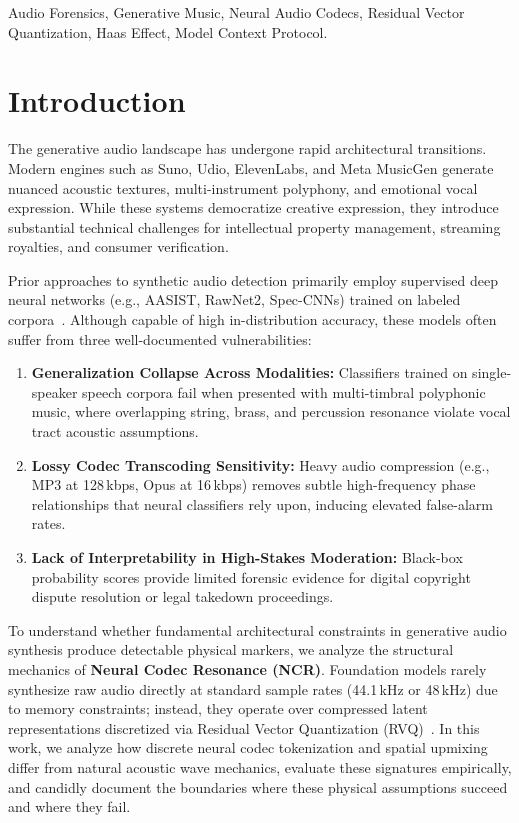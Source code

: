\documentclass[conference]{IEEEtran}
\theoremstyle{definition}
\begin{document}
\begin{IEEEkeywords}
Audio Forensics, Generative Music, Neural Audio Codecs, Residual Vector Quantization, Haas Effect, Model Context Protocol.
\end{IEEEkeywords}

\section{Introduction}

The generative audio landscape has undergone rapid architectural transitions. Modern engines such as Suno, Udio, ElevenLabs, and Meta MusicGen generate nuanced acoustic textures, multi-instrument polyphony, and emotional vocal expression. While these systems democratize creative expression, they introduce substantial technical challenges for intellectual property management, streaming royalties, and consumer verification.

Prior approaches to synthetic audio detection primarily employ supervised deep neural networks (e.g., AASIST, RawNet2, Spec-CNNs) trained on labeled corpora~\cite{yamagishi2021asvspoof, tak2021end}. Although capable of high in-distribution accuracy, these models often suffer from three well-documented vulnerabilities:
\begin{enumerate}
    \item \textbf{Generalization Collapse Across Modalities:} Classifiers trained on single-speaker speech corpora fail when presented with multi-timbral polyphonic music, where overlapping string, brass, and percussion resonance violate vocal tract acoustic assumptions.
    \item \textbf{Lossy Codec Transcoding Sensitivity:} Heavy audio compression (e.g., MP3 at 128\,kbps, Opus at 16\,kbps) removes subtle high-frequency phase relationships that neural classifiers rely upon, inducing elevated false-alarm rates.
    \item \textbf{Lack of Interpretability in High-Stakes Moderation:} Black-box probability scores provide limited forensic evidence for digital copyright dispute resolution or legal takedown proceedings.
\end{enumerate}

To understand whether fundamental architectural constraints in generative audio synthesis produce detectable physical markers, we analyze the structural mechanics of \textbf{Neural Codec Resonance (NCR)}. Foundation models rarely synthesize raw audio directly at standard sample rates (44.1\,kHz or 48\,kHz) due to memory constraints; instead, they operate over compressed latent representations discretized via Residual Vector Quantization (RVQ)~\cite{defossez2022high, kumar2023high}. In this work, we analyze how discrete neural codec tokenization and spatial upmixing differ from natural acoustic wave mechanics, evaluate these signatures empirically, and candidly document the boundaries where these physical assumptions succeed and where they fail.
\end{document}
